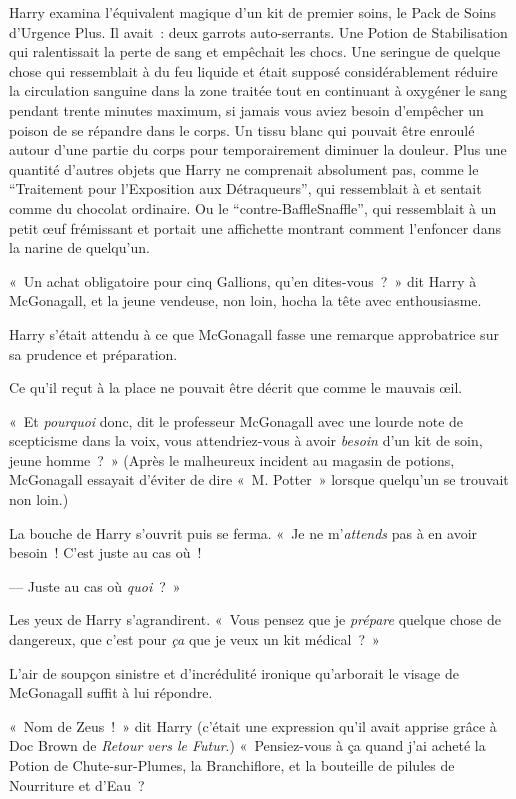 Harry examina l'équivalent magique d'un kit de premier soins, le Pack de Soins d'Urgence Plus. Il avait~: deux garrots auto-serrants. Une Potion de Stabilisation qui ralentissait la perte de sang et empêchait les chocs. Une seringue de quelque chose qui ressemblait à du feu liquide et était supposé considérablement réduire la circulation sanguine dans la zone traitée tout en continuant à oxygéner le sang pendant trente minutes maximum, si jamais vous aviez besoin d'empêcher un poison de se répandre dans le corps. Un tissu blanc qui pouvait être enroulé autour d'une partie du corps pour temporairement diminuer la douleur. Plus une quantité d'autres objets que Harry ne comprenait absolument pas, comme le “Traitement pour l'Exposition aux Détraqueurs”, qui ressemblait à et sentait comme du chocolat ordinaire. Ou le “contre-BaffleSnaffle”, qui ressemblait à un petit œuf frémissant et portait une affichette montrant comment l'enfoncer dans la narine de quelqu'un.

«~Un achat obligatoire pour cinq Gallions, qu'en dites-vous~?~» dit Harry à McGonagall, et la jeune vendeuse, non loin, hocha la tête avec enthousiasme.

Harry s'était attendu à ce que McGonagall fasse une remarque approbatrice sur sa prudence et préparation.

Ce qu'il reçut à la place ne pouvait être décrit que comme le mauvais œil.

«~Et \emph{pourquoi} donc, dit le professeur McGonagall avec une lourde note de scepticisme dans la voix, vous attendriez-vous à avoir \emph{besoin} d'un kit de soin, jeune homme~?~» (Après le malheureux incident au magasin de potions, McGonagall essayait d'éviter de dire «~M. Potter~» lorsque quelqu'un se trouvait non loin.)

La bouche de Harry s'ouvrit puis se ferma.
«~Je ne m'\emph{attends} pas à en avoir besoin~! C'est juste au cas où~!

--- Juste au cas où \emph{quoi}~?~»

Les yeux de Harry s'agrandirent. «~Vous pensez que je \emph{prépare} quelque chose de dangereux, que c'est pour \emph{ça} que je veux un kit médical~?~»

L'air de soupçon sinistre et d'incrédulité ironique qu'arborait le visage de McGonagall suffit à lui répondre.

«~Nom de Zeus\footnotemark{}~!~» dit Harry (c'était une expression qu'il avait apprise grâce à Doc Brown de \emph{Retour vers le Futur}.) «~Pensiez-vous à ça quand j'ai acheté la Potion de Chute-sur-Plumes, la Branchiflore, et la bouteille de pilules de Nourriture et d'Eau~?

